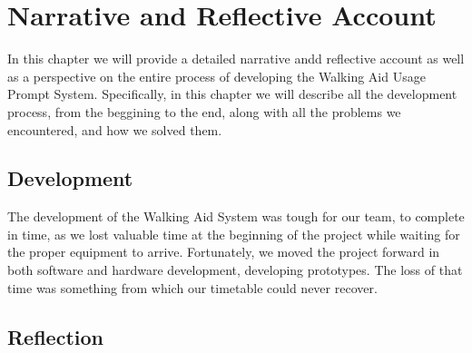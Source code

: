 \chapter{Narrative and Reflective Account}
\label{ch:narrative}

    In this chapter we will provide a detailed narrative andd reflective account as well as a perspective on the entire process of developing the Walking Aid Usage Prompt System. Specifically, in this chapter we will describe all the development process, from the beggining to the end, along with all the problems we encountered, and how we solved them.

    \section{Development}
    \label{sec:development}

    The development of the Walking Aid System was tough for our team, to complete in time, as we lost valuable time at the beginning of the project while waiting for the proper equipment to arrive. Fortunately, we moved the project forward in both software and hardware development, developing prototypes. The loss of that time was something from which our timetable could never recover.

    \section{}
    \label{sec:}



    \section{Reflection}
    \label{sec:Reflection}
